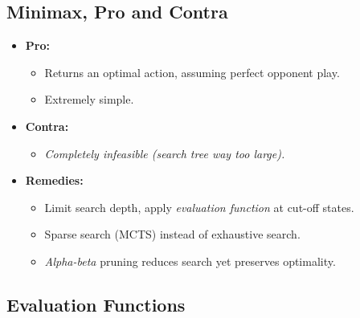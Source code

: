 \documentclass[conference, a4paper]{styles/acmsiggraph}
\begin{document}
    \subsection{Minimax, Pro and Contra}
        \begin{itemize}
            \item \textbf{Pro:}
                \begin{itemize}
                    \item Returns an optimal action, assuming perfect opponent play.
                    \item Extremely simple.
                \end{itemize}
            \item \textbf{Contra:}
                \begin{itemize}
                    \item \textit{Completely infeasible (search tree way too large).}
                \end{itemize}
            \item \textbf{Remedies:}
                \begin{itemize}
                    \item Limit search depth, apply \textit{evaluation function} at cut-off states.
                    \item Sparse search (MCTS) instead of exhaustive search.
                    \item \textit{Alpha-beta} pruning reduces search yet preserves optimality.
                \end{itemize}
        \end{itemize}
    
    
    
    
    
    
    
    
    
    
    
    \subsection{Evaluation Functions}
\end{document}
